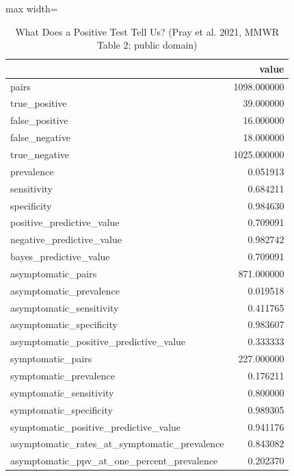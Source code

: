 \begin{table}[htbp]
\centering
\caption{What Does a Positive Test Tell Us? (Pray et al. 2021, MMWR Table 2; public domain)}
\begingroup
\small
\setlength{\tabcolsep}{6pt}
\renewcommand{\arraystretch}{1.12}
\begin{adjustbox}{max width=\linewidth}
\begin{tabular}{@{}lr@{}}
\toprule
 & value \\
\midrule
pairs & 1098.000000 \\
true\_positive & 39.000000 \\
false\_positive & 16.000000 \\
false\_negative & 18.000000 \\
true\_negative & 1025.000000 \\
prevalence & 0.051913 \\
sensitivity & 0.684211 \\
specificity & 0.984630 \\
positive\_predictive\_value & 0.709091 \\
negative\_predictive\_value & 0.982742 \\
bayes\_predictive\_value & 0.709091 \\
asymptomatic\_pairs & 871.000000 \\
asymptomatic\_prevalence & 0.019518 \\
asymptomatic\_sensitivity & 0.411765 \\
asymptomatic\_specificity & 0.983607 \\
asymptomatic\_positive\_predictive\_value & 0.333333 \\
symptomatic\_pairs & 227.000000 \\
symptomatic\_prevalence & 0.176211 \\
symptomatic\_sensitivity & 0.800000 \\
symptomatic\_specificity & 0.989305 \\
symptomatic\_positive\_predictive\_value & 0.941176 \\
asymptomatic\_rates\_at\_symptomatic\_prevalence & 0.843082 \\
asymptomatic\_ppv\_at\_one\_percent\_prevalence & 0.202370 \\
\bottomrule
\end{tabular}
\end{adjustbox}
\endgroup
\end{table}